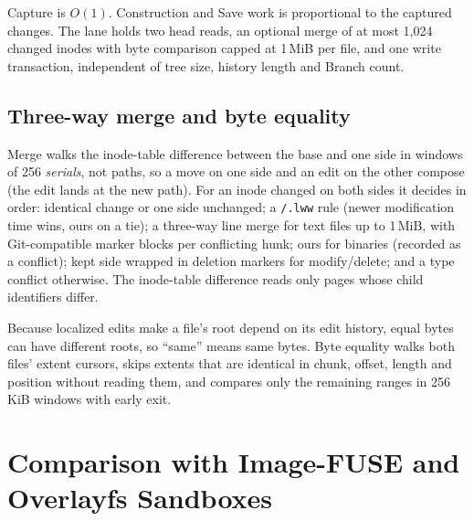 Capture is $O(1)$. Construction and Save work is proportional to the captured changes.
The lane holds two head reads, an optional merge of at most 1,024 changed inodes with
byte comparison capped at 1\,MiB per file, and one write transaction, independent of
tree size, history length and Branch count.

\subsection{Three-way merge and byte equality}

Merge walks the inode-table difference between the base and one side in windows of 256
\emph{serials}, not paths, so a move on one side and an edit on the other compose (the
edit lands at the new path). For an inode changed on both sides it decides in order:
identical change or one side unchanged; a \texttt{/.lww} rule (newer modification time
wins, ours on a tie); a three-way line merge for text files up to 1\,MiB, with
Git-compatible marker blocks per conflicting hunk; ours for binaries (recorded as a
conflict); kept side wrapped in deletion markers for modify/delete; and a type conflict
otherwise. The inode-table difference reads only pages whose child identifiers differ.

Because localized edits make a file's root depend on its edit history, equal bytes can
have different roots, so ``same'' means same bytes. Byte equality walks both files'
extent cursors, skips extents that are identical in chunk, offset, length and position
without reading them, and compares only the remaining ranges in 256\,KiB windows with
early exit.


\section{Comparison with Image-FUSE and Overlayfs Sandboxes}
\label{app:modal}

